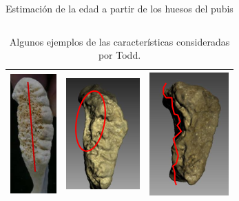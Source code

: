 \documentclass{beamer}
\begin{document}
\begin{frame}{Estimación de la edad a partir de los huesos del pubis}
\begin{columns}[T]
\begin{column}{.7\textwidth}
\begin{table}[H]
{\begin{tabular}{|c|c|c|}
					\includegraphics[scale = 0.75]{huesos/plataforma_dorsal_presente.png} & \includegraphics[scale = 0.75]{huesos/bisel_ventral_en_proceso_formacion.png} &   \includegraphics[scale = 0.75]{huesos/borde_ventral_muchas_excrecencias.png} \\ \hline
					\end{tabular}%
				}
				\caption{Algunos ejemplos de las características consideradas por Todd.}\label{table:caracteristicas_todd}
			\end{table}
		\end{column}

	\end{columns}


\end{frame}
\end{document}
